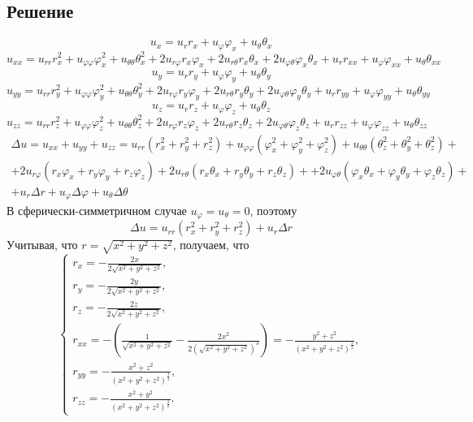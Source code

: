 \documentclass[11pt]{article}
\newcounter{th}\setcounter{th}{0}
\begin{document}
\subsection{Решение}
\label{sec:org027e64d}
$$u_x = u_rr_x + u_{\varphi}\varphi_x + u_{\theta}\theta_x$$
\begin{equation*}
u_{xx} = u_{rr}r_x^2 + u_{\varphi\varphi}\varphi_x^2 + u_{\theta\theta}\theta_x^2 +
2u_{r\varphi}r_x\varphi_x + 2u_{r\theta}r_x\theta_x + 2u_{\varphi\theta}\varphi_x\theta_x +
u_rr_{xx} + u_{\varphi}\varphi_{xx} + u_{\theta}\theta_{xx}
\end{equation*}
$$u_y = u_rr_y + u_{\varphi}\varphi_y + u_{\theta}\theta_y$$
\begin{equation*}
u_{yy} = u_{rr}r_y^2 + u_{\varphi\varphi}\varphi_y^2 + u_{\theta\theta}\theta_y^2 +
2u_{r\varphi}r_y\varphi_y + 2u_{r\theta}r_y\theta_y + 2u_{\varphi\theta}\varphi_y\theta_y +
u_rr_{yy} + u_{\varphi}\varphi_{yy} + u_{\theta}\theta_{yy}
\end{equation*}
$$u_z = u_rr_z + u_{\varphi}\varphi_z + u_{\theta}\theta_z$$
\begin{equation*}
u_{zz} = u_{rr}r_z^2 + u_{\varphi\varphi}\varphi_z^2 + u_{\theta\theta}\theta_z^2 +
2u_{r\varphi}r_z\varphi_z + 2u_{r\theta}r_z\theta_z + 2u_{\varphi\theta}\varphi_z\theta_z +
u_rr_{zz} + u_{\varphi}\varphi_{zz} + u_{\theta}\theta_{zz}
\end{equation*}
\begin{multline}
\Delta u = u_{xx} + u_{yy} + u_{zz} = u_{rr}(r_x^2 + r_y^2 + r_z^2)
+ u_{\varphi\varphi}(\varphi_x^2 + \varphi_y^2 + \varphi_z^2)
+ u_{\theta\theta}(\theta_z^2 + \theta_y^2 + \theta_z^2) + \\
+ 2u_{r\varphi}(r_x\varphi_x + r_y\varphi_y + r_z\varphi_z)
+ 2u_{r\theta}(r_x\theta_x + r_y\theta_y + r_z\theta_z) +
+ 2u_{\varphi\theta}(\varphi_x\theta_x + \varphi_y\theta_y + \varphi_z\theta_z) + \\
+ u_r\Delta r + u_{\varphi}\Delta\varphi + u_{\theta}\Delta\theta
\end{multline}
В сферически-симметричном случае $u_{\varphi} = u_{\theta} = 0$, поэтому
\begin{equation}
\Delta u = u_{rr}(r_x^2 + r_y^2 + r_z^2) + u_r\Delta r
\end{equation}
Учитывая, что $r = \sqrt{x^2 + y^2 + z^2}$, получаем, что
\begin{equation}
\begin{cases}
r_x = -\frac{2x}{2\sqrt{x^2 + y^2 + z^2}}, \\
r_y = -\frac{2y}{2\sqrt{x^2 + y^2 + z^2}}, \\
r_z = -\frac{2z}{2\sqrt{x^2 + y^2 + z^2}}, \\
r_{xx} = -\left(\frac1{\sqrt{x^2 + y^2 + z^2}} - \frac{2x^2}{2(\sqrt{x^2 + y^2 + z^2})^3}\right) =
-\frac{y^2 + z^2}{(x^2 + y^2 + z^2)^{\frac32}}, \\
r_{yy} = -\frac{x^2 + z^2}{(x^2 + y^2 + z^2)^{\frac32}}, \\
r_{zz} = -\frac{x^2 + y^2}{(x^2 + y^2 + z^2)^{\frac32}}.
\end{cases}
\end{equation}
\end{document}
